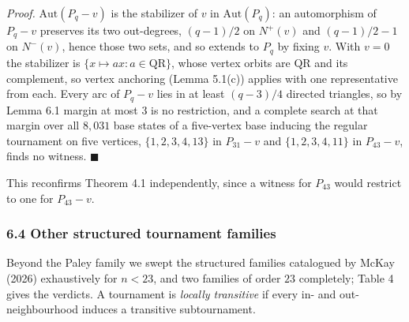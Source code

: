 \documentclass[
]{article}
\begin{document}
\emph{Proof.} \(\mathrm{Aut}(P_{q} - v)\) is the stabilizer of \(v\) in
\(\mathrm{Aut}(P_{q})\): an automorphism of \(P_q - v\) preserves its
two out-degrees, \((q-1)/2\) on \(N^{+}(v)\) and \((q-1)/2 - 1\) on
\(N^{-}(v)\), hence those two sets, and so extends to \(P_q\) by fixing
\(v\). With \(v = 0\) the stabilizer is
\(\{x \mapsto ax : a \in \mathrm{QR}\}\), whose vertex orbits are
\(\mathrm{QR}\) and its complement, so vertex anchoring (Lemma 5.1(c))
applies with one representative from each. Every arc of \(P_q - v\) lies
in at least \((q-3)/4\) directed triangles, so by Lemma 6.1 margin at
most \(3\) is no restriction, and a complete search at that margin over
all \(8{,}031\) base states of a five-vertex base inducing the regular
tournament on five vertices, \(\{1,2,3,4,13\}\) in \(P_{31} - v\) and
\(\{1,2,3,4,11\}\) in \(P_{43} - v\), finds no witness. \(\blacksquare\)

This reconfirms Theorem 4.1 independently, since a witness for
\(P_{43}\) would restrict to one for \(P_{43} - v\).

\subsubsection{6.4 Other structured tournament
families}\label{other-structured-tournament-families}

Beyond the Paley family we swept the structured families catalogued by
McKay (2026) exhaustively for \(n < 23\), and two families of order
\(23\) completely; Table 4 gives the verdicts. A tournament is
\emph{locally transitive} if every in- and out-neighbourhood induces a
transitive subtournament.
\end{document}
